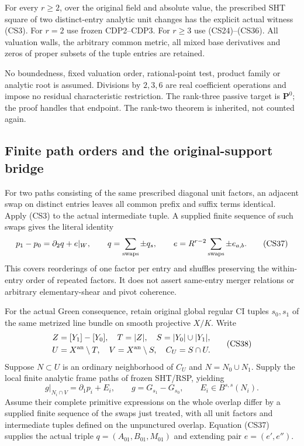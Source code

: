 \begin{theorem}
For every $r\ge2$, over the original field and absolute value,
the prescribed SHT square of two distinct-entry analytic unit
changes has the explicit actual witness (CS3).  For $r=2$
use frozen CDP2--CDP3.  For $r\ge3$ use (CS24)--(CS36).
All valuation walls, the arbitrary common metric, all mixed
base derivatives and zeros of proper subsets of the tuple
entries are retained.
\end{theorem}

No boundedness, fixed valuation order, rational-point test,
product family or analytic root is assumed.  Divisions by
$2,3,6$ are real coefficient operations and impose no residual
characteristic restriction.  The rank-three passive target is
$\mathbf P^0$; the proof handles that endpoint.  The rank-two
theorem is inherited, not counted again.

\subsection{Finite path orders and the original-support bridge}

For two paths consisting of the same prescribed diagonal unit
factors, an adjacent swap on distinct entries leaves all common
prefix and suffix terms identical.  Apply (CS3) to the actual
intermediate tuple.  A supplied finite sequence of such swaps
gives the literal identity
\[
                 p_1-p_0=\partial_2q+e|_W,\qquad
 q=\sum_{\rm swaps}\pm q_s,\qquad
 e=R^{r-2}\sum_{\rm swaps}\pm e_{a,b}.
 \tag{CS37}
\]
This covers reorderings of one factor per entry and shuffles
preserving the within-entry order of repeated factors.  It
does not assert same-entry merger relations or arbitrary
elementary-shear and pivot coherence.

For the actual Green consequence, retain original global regular
CI tuples $s_0,s_1$ of the same metrized line bundle on smooth
projective $X/K$.  Write
\[
 \begin{gathered}
 Z=[Y_1]-[Y_0],\quad T=|Z|,\quad S=|Y_0|\cup|Y_1|,\\
 U=X^{\rm an}\setminus T,\quad V=X^{\rm an}\setminus S,\quad
 C_U=S\cap U.
 \end{gathered}
 \tag{CS38}
\]
Suppose $N\subset U$ is an ordinary neighborhood of $C_U$ and
$N=N_0\cup N_1$.  Supply the local finite analytic frame paths
of frozen SHT/RSP, yielding
\[
       g|_{N_i\cap V}=\partial_1p_i+E_i,\qquad
       g=G_{s_1}-G_{s_0},\qquad E_i\in B^{s,s}(N_i).
 \tag{CS39}
\]
Assume their complete primitive expressions on the whole overlap
differ by a supplied finite sequence of the swaps just treated,
with all unit factors and intermediate tuples defined on the
unpunctured overlap.  Equation (CS37) supplies the actual triple
$q=(A_{01},B_{01},M_{01})$ and extending pair $e=(e',e'')$.

